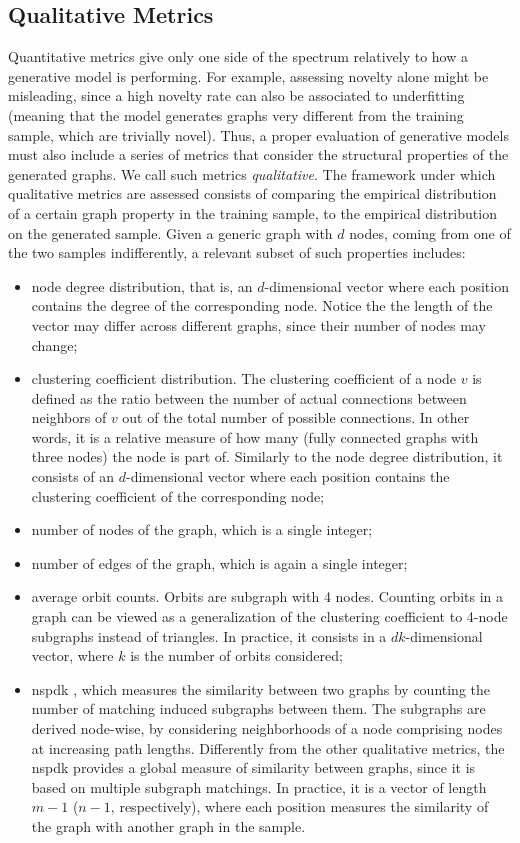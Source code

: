 \subsection{Qualitative Metrics}
Quantitative metrics give only one side of the spectrum relatively to how a generative model is performing. For example, assessing novelty alone might be misleading, since a high novelty rate can also be associated to underfitting (meaning that the model generates graphs very different from the training sample, which are trivially novel). Thus, a proper evaluation of generative models must also include a series of metrics that consider the structural properties of the generated graphs. We call such metrics \emph{qualitative}. The framework under which qualitative metrics are assessed consists of comparing the empirical distribution of a certain graph property in the training sample, to the empirical distribution on the generated sample. Given a generic graph with $d$ nodes, coming from one of the two samples indifferently, a relevant subset of such properties includes:
\begin{itemize}
    \item node degree distribution, that is, an $d$-dimensional vector where each position contains the degree of the corresponding node. Notice the the length of the vector may differ across different graphs, since their number of nodes may change;
    \item clustering coefficient distribution. The clustering coefficient of a node $v$ is defined as the ratio between the number of actual connections between neighbors of $v$ out of the total number of possible connections. In other words, it is a relative measure of how many  (fully connected graphs with three nodes) the node is part of. Similarly to the node degree distribution, it consists of an $d$-dimensional vector where each position contains the clustering coefficient of the corresponding node;
    \item number of nodes of the graph, which is a single integer;
    \item number of edges of the graph, which is again a single integer;
    \item average orbit counts. Orbits are subgraph with 4 nodes. Counting orbits in a graph can be viewed as a generalization of the clustering coefficient to 4-node subgraphs instead of triangles. In practice, it consists in a $dk$-dimensional vector, where $k$ is the number of orbits considered;
    \item \gls{nspdk} \citep{costa2010nspdk}, which measures the similarity between two graphs by counting the number of matching induced subgraphs between them. The subgraphs are derived node-wise, by considering neighborhoods of a node comprising nodes at increasing path lengths. Differently from the other qualitative metrics, the \gls{nspdk} provides a global measure of similarity between graphs, since it is based on multiple subgraph matchings. In practice, it is a vector of length $m-1$ ($n-1$, respectively), where each position measures the similarity of the graph with another graph in the sample.
\end{itemize}
